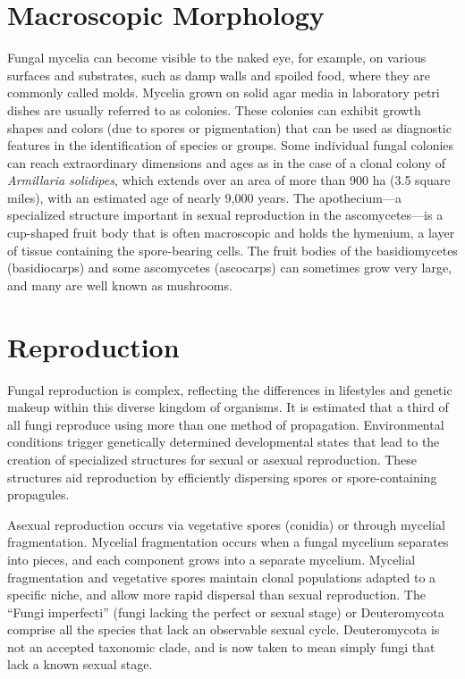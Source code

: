 \documentclass[]{book}
\begin{document}
\hypertarget{macroscopic-morphology}{%
\section{Macroscopic Morphology}\label{macroscopic-morphology}}

Fungal mycelia can become visible to the naked eye, for example, on various surfaces and substrates, such as damp walls and spoiled food, where they are commonly called molds. Mycelia grown on solid agar media in laboratory petri dishes are usually referred to as colonies. These colonies can exhibit growth shapes and colors (due to spores or pigmentation) that can be used as diagnostic features in the identification of species or groups. Some individual fungal colonies can reach extraordinary dimensions and ages as in the case of a clonal colony of \emph{Armillaria solidipes}, which extends over an area of more than 900 ha (3.5 square miles), with an estimated age of nearly 9,000 years.
The apothecium---a specialized structure important in sexual reproduction in the ascomycetes---is a cup-shaped fruit body that is often macroscopic and holds the hymenium, a layer of tissue containing the spore-bearing cells. The fruit bodies of the basidiomycetes (basidiocarps) and some ascomycetes (ascocarps) can sometimes grow very large, and many are well known as mushrooms.

\hypertarget{reproduction}{%
\section{Reproduction}\label{reproduction}}

Fungal reproduction is complex, reflecting the differences in lifestyles and genetic makeup within this diverse kingdom of organisms. It is estimated that a third of all fungi reproduce using more than one method of propagation. Environmental conditions trigger genetically determined developmental states that lead to the creation of specialized structures for sexual or asexual reproduction. These structures aid reproduction by efficiently dispersing spores or spore-containing propagules.

Asexual reproduction occurs via vegetative spores (conidia) or through mycelial fragmentation. Mycelial fragmentation occurs when a fungal mycelium separates into pieces, and each component grows into a separate mycelium. Mycelial fragmentation and vegetative spores maintain clonal populations adapted to a specific niche, and allow more rapid dispersal than sexual reproduction. The ``Fungi imperfecti'' (fungi lacking the perfect or sexual stage) or
Deuteromycota comprise all the species that lack an observable sexual cycle. Deuteromycota is not an accepted taxonomic clade, and is now taken to mean simply fungi that lack a known sexual stage.
\end{document}
